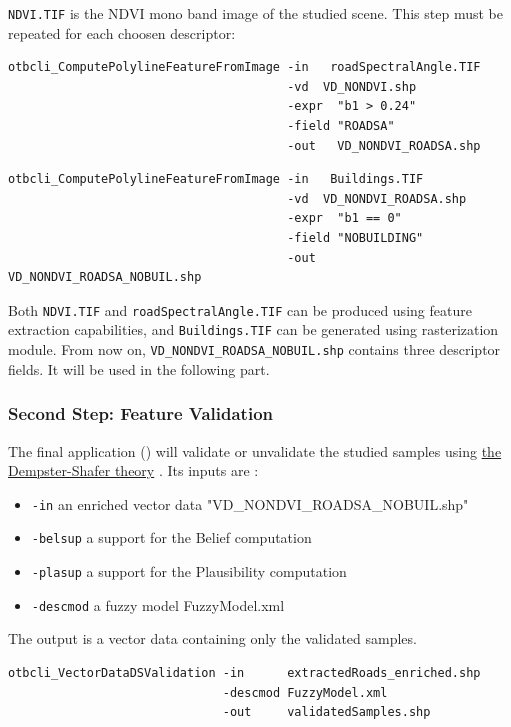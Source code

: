\verb?NDVI.TIF? is the NDVI mono band image of the studied scene.
This step must be repeated for each choosen descriptor:

\begin{verbatim}
otbcli_ComputePolylineFeatureFromImage -in   roadSpectralAngle.TIF
                                       -vd  VD_NONDVI.shp
                                       -expr  "b1 > 0.24"
                                       -field "ROADSA"
                                       -out   VD_NONDVI_ROADSA.shp
\end{verbatim}

\begin{verbatim}
otbcli_ComputePolylineFeatureFromImage -in   Buildings.TIF
                                       -vd  VD_NONDVI_ROADSA.shp
                                       -expr  "b1 == 0"
                                       -field "NOBUILDING"
                                       -out   VD_NONDVI_ROADSA_NOBUIL.shp
\end{verbatim}

Both \verb?NDVI.TIF? and \verb?roadSpectralAngle.TIF? can be produced
using \mont feature extraction capabilities, and \verb?Buildings.TIF?
can be generated using \mont rasterization module. From now on,
\verb?VD_NONDVI_ROADSA_NOBUIL.shp? contains three descriptor fields.
It will be used in the following part.

\subsubsection{Second Step: Feature Validation}

The final application () will
validate or unvalidate the studied samples using
\href{http://en.wikipedia.org/wiki/Dempster\%E2\%80\%93Shafer_theory}{the Dempster-Shafer theory}
. Its inputs are :
\begin{itemize}
\item \verb?-in? an enriched vector data "VD\_NONDVI\_ROADSA\_NOBUIL.shp"
\item \verb?-belsup? a support for the Belief computation
\item \verb?-plasup? a support for the Plausibility computation
\item \verb?-descmod? a fuzzy model FuzzyModel.xml
\end{itemize}
The output is a vector data containing only the validated samples.

\begin{verbatim}
otbcli_VectorDataDSValidation -in      extractedRoads_enriched.shp
                              -descmod FuzzyModel.xml
                              -out     validatedSamples.shp
\end{verbatim}


